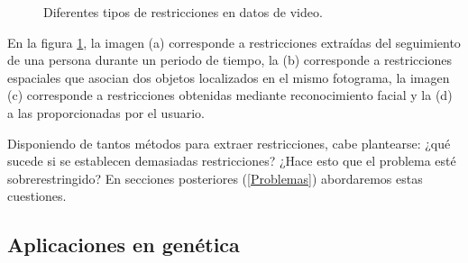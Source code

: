 \begin{figure}[bth]
	\myfloatalign
	\quad
	 \quad
	\quad
	\caption[Diferentes tipos de restricciones en datos de video.]{Diferentes tipos de restricciones en datos de video. \cite{Yan:2006} \cite{Survey:2007}}\label{fig:figure12}
\end{figure}

En la figura \ref{fig:figure12}, la imagen (a) corresponde a restricciones extraídas del seguimiento de una persona durante un periodo de tiempo, la (b) corresponde a restricciones espaciales que asocian dos objetos localizados en el mismo fotograma, la imagen (c) corresponde a restricciones obtenidas mediante reconocimiento facial y la (d) a las proporcionadas por el usuario.

Disponiendo de tantos métodos para extraer restricciones, cabe plantearse: ¿qué sucede si se establecen demasiadas restricciones? ¿Hace esto que el problema esté sobrerestringido? En secciones posteriores (\ref{Problemas}) abordaremos estas cuestiones.

\subsection{Aplicaciones en genética}

